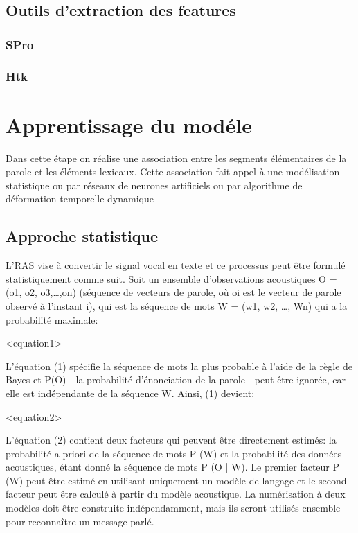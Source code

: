 \documentclass[a4paper, 12pt]{book}
\begin{document}
\subsection{Outils d'extraction des features}

\subsubsection{SPro}

\subsubsection{Htk}


\section{Apprentissage du modéle}

Dans cette étape on réalise une association entre les segments élémentaires de la parole et les éléments lexicaux. Cette association fait appel à une modélisation statistique ou par réseaux de neurones artificiels ou par algorithme de déformation temporelle dynamique

\subsection{Approche statistique}

L’RAS vise à convertir le signal vocal en texte et ce processus peut être formulé statistiquement comme suit. Soit un ensemble d'observations acoustiques O = (o1, o2, o3,…,on) (séquence de vecteurs de parole, où oi est le vecteur de parole observé à l'instant i), qui est la séquence de mots W = (w1, w2, …, Wn) qui a la probabilité maximale:

<equation1>

L'équation (1) spécifie la séquence de mots la plus probable à l'aide de la règle de Bayes et P(O) - la probabilité d'énonciation de la parole - peut être ignorée, car elle est indépendante de la séquence W. Ainsi, (1) devient:

<equation2>

L'équation (2) contient deux facteurs qui peuvent être directement estimés: la probabilité a priori de la séquence de mots P (W) et la probabilité des données acoustiques, étant donné la séquence de mots P (O | W). Le premier facteur P (W) peut être estimé en utilisant uniquement un modèle de langage et le second facteur peut être calculé à partir du modèle acoustique. La numérisation à deux modèles doit être construite indépendamment, mais ils seront utilisés ensemble pour reconnaître un message parlé.
\end{document}
